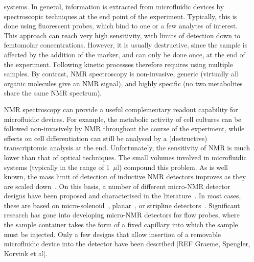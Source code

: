 \documentclass[preprint,12pt]{article}
\begin{document}
systems. In general, information is extracted from microfluidic devices by spectroscopic 
techniques at the end point of the experiment. Typically, 
this is done using fluorescent probes, which bind to one or a few analytes of interest. 
This approach can reach very high sensitivity, with limits of detection down to 
femtomolar concentrations. However, it is usually destructive, since the sample is 
affected by the addition of the marker, and can only be done once, at the end of the 
experiment. Following kinetic processes therefore requires using multiple samples. By 
contrast, NMR spectroscopy is non-invasive, generic (virtually all organic 
molecules give an NMR signal), and highly specific (no two metabolites share 
the same NMR spectrum). 

NMR spectroscopy can provide a useful complementary readout capability 
for microfluidic devices. For example, the metabolic activity of cell cultures 
can be followed non-invasively by NMR throughout the course of the experiment, 
while effects on cell differentiation can still be analysed by a (destructive) 
transcriptomic analysis at the end. Unfortunately, the sensitivity 
of NMR is much lower than that of optical techniques. 
The small volumes involved in microfluidic systems
 (typically in the range of 1~$\mu$l) 
compound this problem. As is well known, the mass limit of detection of 
inductive NMR detectors improves as they are scaled down~\cite{Olson1995}. 
On this basis, a number of different micro-NMR detector designs have been 
proposed and characterised in the literature~\cite{utz2012review,micronmr2014review}. 
In most cases, these are based on micro-solenoid~\cite{SUBRAMANIAN1998,Pines2007}, 
planar~\cite{Maguire2007,dieter2008,EHRMANN200}, or stripline 
detectors~\cite{stripline_jan}. 
Significant research has gone into developing micro-NMR detectors for flow probes, 
where the sample container takes the form of a fixed capillary into which the sample
must be injected. Only a few designs that allow insertion of a removable microfluidic 
device into the detector have been described [REF Graeme, Spengler, Korvink et al].
\end{document}
